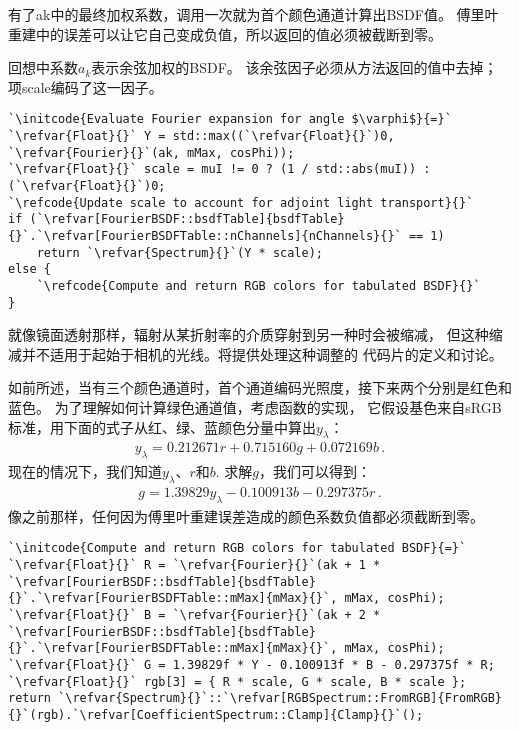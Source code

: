 有了{\ttfamily ak}中的最终加权系数，调用一次就为首个颜色通道计算出BSDF值。
傅里叶重建中的误差可以让它自己变成负值，所以返回的值必须被截断到零。

回想中系数$a_k$表示余弦加权的BSDF。
该余弦因子必须从方法返回的值中去掉；
项{\ttfamily scale}编码了这一因子。
\begin{lstlisting}
`\initcode{Evaluate Fourier expansion for angle $\varphi$}{=}`
`\refvar{Float}{}` Y = std::max((`\refvar{Float}{}`)0, `\refvar{Fourier}{}`(ak, mMax, cosPhi));
`\refvar{Float}{}` scale = muI != 0 ? (1 / std::abs(muI)) : (`\refvar{Float}{}`)0;
`\refcode{Update scale to account for adjoint light transport}{}`
if (`\refvar[FourierBSDF::bsdfTable]{bsdfTable}{}`.`\refvar[FourierBSDFTable::nChannels]{nChannels}{}` == 1)
    return `\refvar{Spectrum}{}`(Y * scale);
else {
    `\refcode{Compute and return RGB colors for tabulated BSDF}{}`
}
\end{lstlisting}

就像镜面透射那样，辐射从某折射率的介质穿射到另一种时会被缩减，
但这种缩减并不适用于起始于相机的光线。将提供处理这种调整的
代码片的定义和讨论。

如前所述，当有三个颜色通道时，首个通道编码光照度，接下来两个分别是红色和蓝色。
为了理解如何计算绿色通道值，考虑函数的实现，
它假设基色来自sRGB标准，用下面的式子从红、绿、蓝颜色分量中算出$y_{\lambda}$：
\begin{align*}
    y_{\lambda}=0.212671r+0.715160g+0.072169b\, .
\end{align*}
现在的情况下，我们知道$y_{\lambda}$、$r$和$b$. 求解$g$，我们可以得到：
\begin{align*}
    g=1.39829y_{\lambda}-0.100913b-0.297375r\, .
\end{align*}
像之前那样，任何因为傅里叶重建误差造成的颜色系数负值都必须截断到零。
\begin{lstlisting}
`\initcode{Compute and return RGB colors for tabulated BSDF}{=}`
`\refvar{Float}{}` R = `\refvar{Fourier}{}`(ak + 1 * `\refvar[FourierBSDF::bsdfTable]{bsdfTable}{}`.`\refvar[FourierBSDFTable::mMax]{mMax}{}`, mMax, cosPhi);
`\refvar{Float}{}` B = `\refvar{Fourier}{}`(ak + 2 * `\refvar[FourierBSDF::bsdfTable]{bsdfTable}{}`.`\refvar[FourierBSDFTable::mMax]{mMax}{}`, mMax, cosPhi);
`\refvar{Float}{}` G = 1.39829f * Y - 0.100913f * B - 0.297375f * R;
`\refvar{Float}{}` rgb[3] = { R * scale, G * scale, B * scale };
return `\refvar{Spectrum}{}`::`\refvar[RGBSpectrum::FromRGB]{FromRGB}{}`(rgb).`\refvar[CoefficientSpectrum::Clamp]{Clamp}{}`();
\end{lstlisting}

